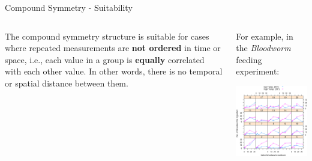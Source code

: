 \documentclass{beamer}
\begin{document}
\begin{frame}{Compound Symmetry - Suitability}
\begin{columns}
    \begin{column}{0.5\textwidth}
    The compound symmetry structure is suitable for cases where repeated measurements are \textbf{not ordered} in time or space, i.e., each value in a group is \textbf{equally} correlated with each other value. In other words, there is no temporal or spatial distance between them. 
    \end{column}
    \begin{column}{0.5\textwidth}
    \centering
    For example, in the \textit{Bloodworm} feeding experiment:
    \vspace{0.5cm}
    
    \includegraphics[width=\textwidth]{lectures/day_4_GLS/figures/bloodworms.png}
    \end{column}
\end{columns}
\end{frame}
\end{document}
